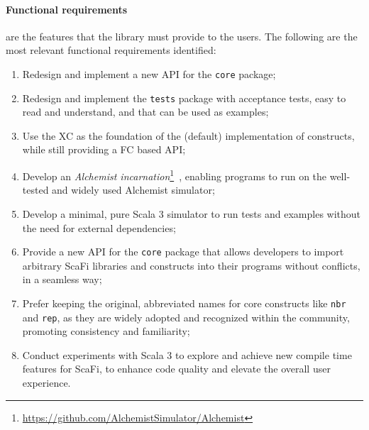 \paragraph{Functional requirements} are the features that the library must provide to the users. The following are the most relevant functional requirements identified:
\begin{enumerate}[label=\textbf{F.\arabic*}]
    \item Redesign and implement a new \ac{API} for the \texttt{core} package;
    \item Redesign and implement the \texttt{tests} package with acceptance tests, easy to read and understand, and that can be used as examples;
    \item Use the \ac{XC} as the foundation of the (default) implementation of constructs, while still providing a \ac{FC} based API;
    \item Develop an \textit{Alchemist incarnation}\footnote{\url{https://github.com/AlchemistSimulator/Alchemist}}~\cite{alchemist}, enabling \this programs to run on the well-tested and widely used Alchemist simulator;
    \item Develop a minimal, pure Scala 3 simulator to run tests and examples without the need for external dependencies;
    \item Provide a new API for the \texttt{core} package that allows developers to import arbitrary ScaFi libraries and constructs into their programs without conflicts, in a seamless way;
    \item Prefer keeping the original, abbreviated names for core constructs like \texttt{nbr} and \texttt{rep}, as they are widely adopted and recognized within the community, promoting consistency and familiarity;
    \item Conduct experiments with Scala 3 to explore and achieve new compile time features for ScaFi, to enhance code quality and elevate the overall user experience.
\end{enumerate}

